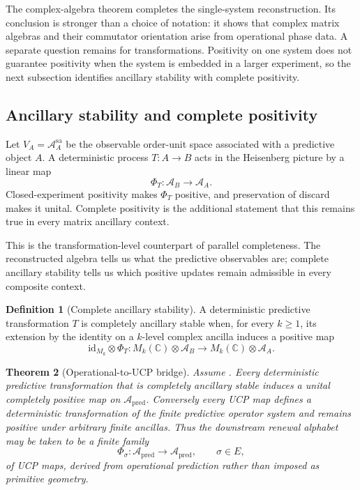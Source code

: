 \documentclass[11pt]{article}
\newtheorem{theorem}{Theorem}[section]
\theoremstyle{definition}
\newtheorem{definition}[theorem]{Definition}
\theoremstyle{remark}
\newcommand{\C}{\mathbb C}
\newcommand{\id}{\mathrm{id}}
\newcommand{\A}{\mathcal A}
\newcommand{\pred}{\mathrm{pred}}
\begin{document}
The complex-algebra theorem completes the single-system reconstruction.  Its
conclusion is stronger than a choice of notation: it shows that complex matrix
algebras and their commutator orientation arise from operational phase data.  A
separate question remains for transformations.  Positivity on one system does not
guarantee positivity when the system is embedded in a larger experiment, so the
next subsection identifies ancillary stability with complete positivity.

\subsection{Ancillary stability and complete positivity}

Let $V_A=\A_A^{\mathrm{sa}}$ be the observable order-unit space associated with
a predictive object $A$.  A deterministic process $T:A\to B$ acts in the
Heisenberg picture by a linear map
\[
 \Phi_T:\A_B\longrightarrow\A_A.
\]
Closed-experiment positivity makes $\Phi_T$ positive, and preservation of
discard makes it unital.  Complete positivity is the additional statement
that this remains true in every matrix ancillary context.

This is the transformation-level counterpart of parallel completeness.  The
reconstructed algebra tells us what the predictive observables are; complete
ancillary stability tells us which positive updates remain admissible in every
composite context.

\begin{definition}[Complete ancillary stability]
\label{def:ancillary-stability}
A deterministic predictive transformation $T$ is completely ancillary stable
when, for every $k\ge1$, its extension by the identity on a $k$-level complex
ancilla induces a positive map
\[
 \id_{M_k}\otimes\Phi_T:
 M_k(\C)\otimes\A_B\longrightarrow M_k(\C)\otimes\A_A.
\]
\end{definition}

\begin{theorem}[Operational-to-UCP bridge]
\label{thm:operational-ucp}
Assume .  Every deterministic predictive
transformation that is completely ancillary stable induces a unital completely
positive map on $\A_{\pred}$.  Conversely every UCP map defines a deterministic
transformation of the finite predictive operator system and remains positive
under arbitrary finite ancillas.  Thus the downstream renewal alphabet may be
taken to be a finite family
\[
 \Phi_\sigma:\A_{\pred}\to\A_{\pred},
 \qquad \sigma\in E,
\]
of UCP maps, derived from operational prediction rather than imposed as
primitive geometry.
\end{theorem}
\end{document}
